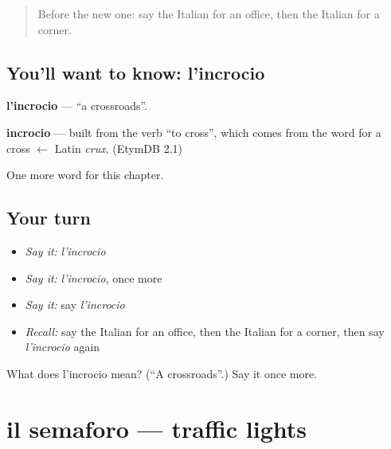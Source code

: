 \label{lesson:IT-C89-incrocio}



\begin{quote}
Before the new one: say the Italian for an office, then the Italian for a corner.
\end{quote}

\subsection*{You'll want to know: l'incrocio}
\textbf{l'incrocio} — \textquotedblleft{}a crossroads\textquotedblright{}.

\begin{cousinweb}
\textbf{incrocio} — built from the verb \textquotedblleft{}to cross\textquotedblright{}, which comes from the word for a cross $\leftarrow$ Latin \emph{crux}. (EtymDB 2.1)
\end{cousinweb}

\begin{grammarlens}[title={What you've built}]
One more word for this chapter.
\end{grammarlens}

\subsection*{Your turn}
\begin{itemize}
\raggedright
  \item \emph{Say it:} \emph{l'incrocio}
  \item \emph{Say it:} \emph{l'incrocio}, once more
  \item \emph{Say it:} say \emph{l'incrocio}
  \item \emph{Recall:} say the Italian for an office, then the Italian for a corner, then say \emph{l'incrocio} again
\end{itemize}

\begin{tcolorbox}[breakable,colback=teal!4,colframe=teal!35!black,title={Before you move on}]
What does l'incrocio mean? (\textquotedblleft{}A crossroads\textquotedblright{}.) Say it once more.
\end{tcolorbox}
\section[il semaforo]{il semaforo — traffic lights}

\label{lesson:IT-C89-semaforo}



